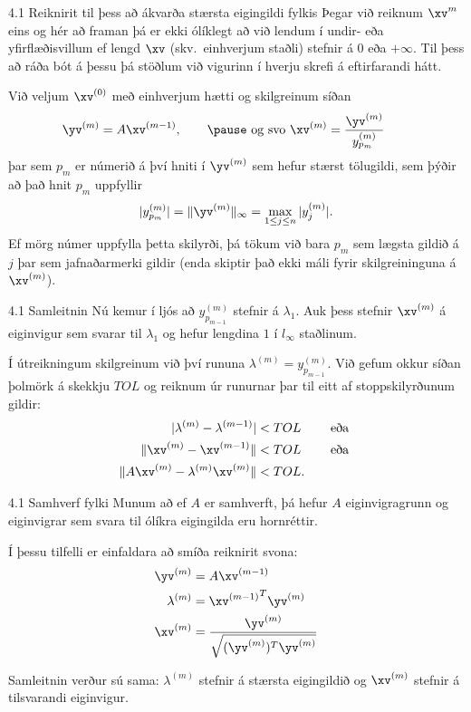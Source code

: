 \begin{frame}{4.1 Reiknirit til þess að ákvarða stærsta eigingildi fylkis} 
Þegar við reiknum $\xv^{m}$ eins og hér að framan þá er ekki ólíklegt að 
við lendum í undir- eða yfirflæðisvillum ef lengd $\xv$ (skv.~einhverjum staðli)
stefnir á 0 eða $+\infty$. Til þess að ráða bót á þessu þá stöðlum við vigurinn
í hverju skrefi á eftirfarandi hátt.

\pause

\smallskip
Við veljum $\xv^{(0)}$ með einhverjum hætti og skilgreinum síðan
$$
\yv^{(m)}=A\xv^{(m-1)}, \qquad \pause \text{ og svo }
\xv^{(m)}=\dfrac{\yv^{(m)}}{y_{p_m}^{(m)}} \qquad 
$$
\pause
þar sem $p_m$ er númerið á því hniti í $\yv^{(m)}$ sem hefur stærst
tölugildi, sem þýðir að það hnit $p_m$ uppfyllir
$$
|y_{p_m}^{(m)}|=\|\yv^{(m)}\|_\infty=\max_{1\leq j\leq n}|y_j^{(m)}|.
$$
\pause
Ef mörg númer uppfylla þetta skilyrði, þá tökum við bara $p_m$ sem
lægsta gildið á $j$ þar sem jafnaðarmerki gildir \pause
(enda skiptir það ekki máli fyrir skilgreininguna á $\xv^{(m)}$).
\end{frame}

\begin{frame}{4.1 Samleitnin} 
Nú kemur í ljós að 
$y_{p_{m-1}}^{(m)}$ stefnir á $\lambda_1$. 
Auk þess stefnir $\xv^{(m)}$ á eiginvigur sem svarar til $\lambda_1$ og hefur 
lengdina $1$ í $l_\infty$ staðlinum.

\pause
\smallskip
Í útreikningum skilgreinum við því rununa
$\lambda^{(m)}=y_{p_{m-1}}^{(m)}$.
Við gefum okkur síðan þolmörk á skekkju $TOL$ og reiknum úr runurnar
þar til eitt af stoppskilyrðunum gildir: 
\begin{align*}
|\lambda^{(m)}-\lambda^{(m-1)}|&<TOL \qquad \text{ eða } \\
\|\xv^{(m)}-\xv^{(m-1)}\|&<TOL \qquad \text { eða } \\
\|A\xv^{(m)}-\lambda^{(m)}\xv^{(m)}\|&<TOL.
\end{align*}
\end{frame}

\begin{frame}{4.1 Samhverf fylki} 
Munum að ef $A$ er samhverft, þá hefur $A$ eiginvigragrunn og
eiginvigrar sem svara til ólíkra eigingilda eru hornréttir. 

\pause
\smallskip
Í þessu tilfelli er einfaldara að smíða reiknirit svona:
\begin{align*}
  \yv^{(m)}&=A\xv^{(m-1)}\\
\lambda^{(m)}&={\xv^{(m-1)}}^T\yv^{(m)}\\
\xv^{(m)}&= \frac{\yv^{(m)}}{\sqrt{(\yv^{(m)})^T\yv^{(m)}}}
\end{align*}

\pause
Samleitnin verður sú sama:  $\lambda^{(m)}$ stefnir á stærsta
eigingildið og $\xv^{(m)}$ stefnir á tilsvarandi eiginvigur.
\end{frame}

